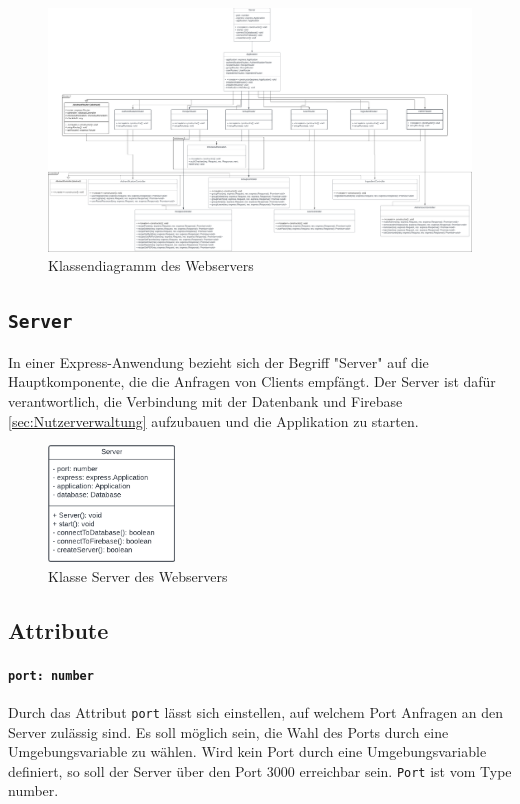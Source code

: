 \documentclass{entwurfsheft}
\begin{document}
\begin{figure}[htp]
    \centering
    \includegraphics[width = 1\textwidth]{images/webserver/webserver.pdf}
    \caption{Klassendiagramm des Webservers}
    \label{fig:webserver}
\end{figure}

\newpage

\subsection{\texttt{Server}}\label{sec:Server}
In einer Express-Anwendung bezieht sich der Begriff "Server" auf die Hauptkomponente, die die Anfragen von Clients empfängt.
Der Server ist dafür verantwortlich, die Verbindung mit der Datenbank und Firebase \ref{sec:Nutzerverwaltung} aufzubauen und die Applikation zu starten.

\begin{figure}[htp]
    \centering
    \includegraphics[width = 0.3\textwidth]{images/webserver/server.pdf}
    \caption{Klasse Server des Webservers}
    \label{fig:server}
\end{figure}

\subsection*{Attribute}
\paragraph{\texttt{port: number}}
Durch das Attribut \texttt{port} lässt sich einstellen, auf welchem Port Anfragen an den Server zulässig sind. Es soll möglich sein, die Wahl des Ports durch eine Umgebungsvariable zu wählen. Wird kein Port durch eine Umgebungsvariable definiert, so soll der Server über den Port 3000 erreichbar sein.
\texttt{Port} ist vom Type number.
\end{document}

